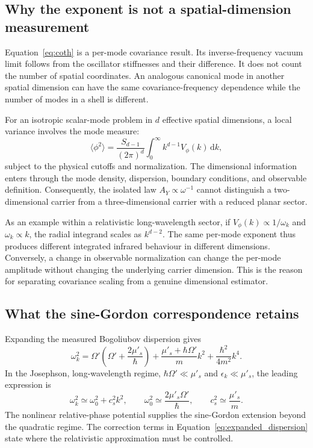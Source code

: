 \documentclass[11pt,a4paper]{article}
\theoremstyle{definition}
\theoremstyle{remark}
\newcommand{\dd}{\mathrm{d}}
\newcommand{\musp}{\mu'_s}
\begin{document}
\subsection{Why the exponent is not a spatial-dimension measurement}
Equation~\eqref{eq:coth} is a per-mode covariance result. Its inverse-frequency vacuum limit follows from the oscillator stiffnesses and their difference. It does not count the number of spatial coordinates. An analogous canonical mode in another spatial dimension can have the same covariance-frequency dependence while the number of modes in a shell is different.

For an isotropic scalar-mode problem in $d$ effective spatial dimensions, a local variance involves the mode measure:
\begin{equation}
 \langle\phi^2\rangle
 =\frac{S_{d-1}}{(2\pi)^d}
   \int_0^\infty k^{d-1}V_\phi(k)\,\dd k,
 \label{eq:mode_measure}
\end{equation}
subject to the physical cutoffs and normalization. The dimensional information enters through the mode density, dispersion, boundary conditions, and observable definition. Consequently, the isolated law $A_Y\propto\omega^{-1}$ cannot distinguish a two-dimensional carrier from a three-dimensional carrier with a reduced planar sector.

As an example within a relativistic long-wavelength sector, if $V_\phi(k)\propto1/\omega_k$ and $\omega_k\propto k$, the radial integrand scales as $k^{d-2}$. The same per-mode exponent thus produces different integrated infrared behaviour in different dimensions. Conversely, a change in observable normalization can change the per-mode amplitude without changing the underlying carrier dimension. This is the reason for separating covariance scaling from a genuine dimensional estimator.

\subsection{What the sine-Gordon correspondence retains}
Expanding the measured Bogoliubov dispersion gives
\begin{equation}
 \omega_k^2
 =\Omega'\!\left(\Omega'+\frac{2\musp}{\hbar}\right)
 +\frac{\musp+\hbar\Omega'}{m}k^2
 +\frac{\hbar^2}{4m^2}k^4.
 \label{eq:expanded_dispersion}
\end{equation}
In the Josephson, long-wavelength regime, $\hbar\Omega'\ll\musp$ and $\epsilon_k\ll\musp$, the leading expression is
\begin{equation}
 \omega_k^2\simeq\omega_0^2+c_s^2k^2,
 \qquad \omega_0^2\simeq\frac{2\musp\Omega'}{\hbar},
 \qquad c_s^2\simeq\frac{\musp}{m}.
 \label{eq:relativistic}
\end{equation}
The nonlinear relative-phase potential supplies the sine-Gordon extension beyond the quadratic regime. The correction terms in Equation~\eqref{eq:expanded_dispersion} state where the relativistic approximation must be controlled.\cite{zhang2026,precursor,son}
\end{document}
